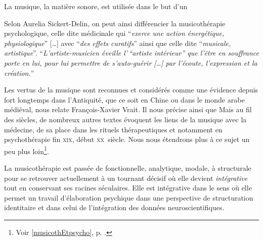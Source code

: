 La musique, la matière sonore, est utilisée dans le but d'un 

 Selon Aurelia Sickert-Delin, on peut ainsi différencier la musicothérapie 
psychologique, celle dite médicinale qui \enquote{\emph{exerce une action 
énergétique, physiologique}} [\dots] avec \enquote{\emph{des effets curatifs}}  
ainsi que celle dite \enquote{\emph{musicale, artistique}}.
 \enquote{\emph{L'artiste-musicien éveille l'\,``artiste intérieur'' que l'être 
en souffrance porte en lui, pour lui permettre de s'auto-guérir [\dots] par 
l'écoute, l'expression et la création.}}\autocite[ch. 1,  p. 14, du texte 
inédit communiqué par A. Sickert-Delin, musicothérapeute à Alersheim, à J. 
Viret]{viret:b}
 	 
 	 
Les vertus de la musique sont reconnues et considérés comme une évidence depuis 
fort longtemps dans l'Antiquité, que ce soit en Chine ou dans le monde arabe 
médiéval, nous relate François-Xavier Vrait.  
 Il nous précise ainsi que \autocite[ch. III, p. 
96]{vrait_musicotherapie_2018} Mais au fil des siècles, de nombreux autres 
textes évoquent les liens de la musique avec la médecine, de sa place dans les 
rituels thérapeutiques et notamment en psychothérapie fin \textsc{xix}\ieme, 
début \textsc{xx}\ieme\ siècle. Nous nous étendrons plus à ce sujet un peu plus 
loin\footnote{Voir \ref{musicothEtpsycho}, p. \pageref{musicothEtpsycho}.}.
 
 La musicothérapie est passée de fonctionnelle, analytique, mo\-da\-le,  à 
struc\-tu\-rale pour se retrouver actuellement 
 à un tournant décisif où elle devient 
 \emph{intégrative} tout en conservant ses racines séculaires. Elle est 
intégrative dans le sens où elle permet un travail d'élaboration psychique dans 
une perspective de structuration identitaire \autocite[ch. III, p. 53, 
105]{vrait_musicotherapie_2018} et dans celui de l'intégration des données 
neuroscientifiques.
 

